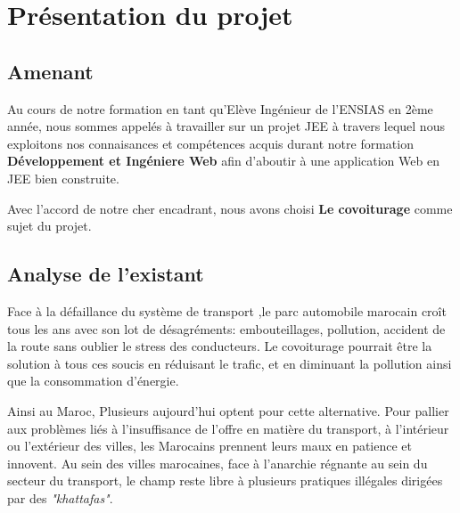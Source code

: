 \documentclass[a4paper]{report}
\begin{document}
\tableofcontents
\thispagestyle{empty}
\setcounter{page}{0}

\newpage

\renewcommand{\arraystretch}{1.5}






\chapter{Présentation du projet}

\section{Amenant}

\par 
Au cours de notre formation en tant qu'Elève Ingénieur de l'ENSIAS en 2ème année, nous sommes appelés à travailler sur un projet JEE à travers lequel nous exploitons nos connaisances et compétences acquis durant notre formation \textbf{Développement et Ingéniere Web} afin d'aboutir à une application Web en JEE bien construite. 

Avec l'accord de notre cher encadrant, nous avons choisi \textbf{Le covoiturage} comme sujet du projet. 

\section{Analyse de l'existant}

\par 
Face à la défaillance du système de transport ,le parc automobile marocain croît tous les ans avec son lot de désagréments: embouteillages, pollution, accident de la route sans oublier le stress des conducteurs. Le covoiturage pourrait être la solution à tous ces soucis en réduisant le trafic, et en diminuant la pollution ainsi que la consommation d’énergie.

Ainsi au Maroc, Plusieurs aujourd'hui optent pour cette alternative. Pour pallier aux problèmes liés à l’insuffisance de l’offre en matière du transport, à l’intérieur ou l’extérieur des villes, les Marocains prennent leurs maux en patience et innovent. Au sein des villes marocaines, face à l’anarchie régnante au sein du secteur du transport, le champ reste libre à plusieurs pratiques illégales dirigées par des \textit{"khattafas"}.
\end{document}
